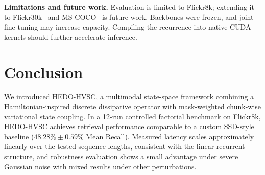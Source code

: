 \documentclass[pdflatex,sn-mathphys-num]{sn-jnl}
\begin{document}
\textbf{Limitations and future work.} Evaluation is limited to Flickr8k; extending it to Flickr30k~\cite{young2014image} and MS-COCO~\cite{lin2014microsoft} is future work. Backbones were frozen, and joint fine-tuning may increase capacity. Compiling the recurrence into native CUDA kernels should further accelerate inference.


\section{Conclusion}
\label{sec:conclusion}
We introduced HEDO-HVSC, a multimodal state-space framework combining a Hamiltonian-inspired discrete dissipative operator with mask-weighted chunk-wise variational state coupling. In a 12-run controlled factorial benchmark on Flickr8k, HEDO-HVSC achieves retrieval performance comparable to a custom SSD-style baseline ($48.28\% \pm 0.59\%$ Mean Recall). Measured latency scales approximately linearly over the tested sequence lengths, consistent with the linear recurrent structure, and robustness evaluation shows a small advantage under severe Gaussian noise with mixed results under other perturbations.


\end{document}
